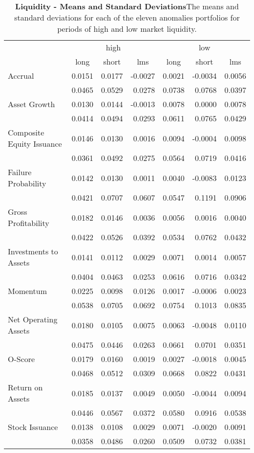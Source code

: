 \begin{table}[hbt]
\centering
\scriptsize
\caption[LIQ - Means and Standard Deviations]{\textbf{Liquidity - Means and Standard Deviations}\newline The means and standard deviations for each of the eleven anomalies portfolios for periods of high and low market liquidity.}
\label{tab:liq-stats}
\begin{tabular}{@{}lrrrrrr@{}}
\toprule
& \multicolumn{3}{c}{high} & \multicolumn{3}{c}{low} \\ \cmidrule(l){2-7} 
& \multicolumn{1}{c}{long} & \multicolumn{1}{c}{short} & \multicolumn{1}{c}{lms} & \multicolumn{1}{c}{long} & \multicolumn{1}{c}{short} & \multicolumn{1}{c}{lms} \\ \midrule
Accrual & 0.0151 & 0.0177 & -0.0027 & 0.0021 & -0.0034 & 0.0056 \\
& 0.0465 & 0.0529 & 0.0278 & 0.0738 & 0.0768 & 0.0397 \\
Asset Growth & 0.0130 & 0.0144 & -0.0013 & 0.0078 & 0.0000 & 0.0078 \\
& 0.0414 & 0.0494 & 0.0293 & 0.0611 & 0.0765 & 0.0429 \\
Composite Equity Issuance & 0.0146 & 0.0130 & 0.0016 & 0.0094 & -0.0004 & 0.0098 \\
& 0.0361 & 0.0492 & 0.0275 & 0.0564 & 0.0719 & 0.0416 \\
Failure Probability & 0.0142 & 0.0130 & 0.0011 & 0.0040 & -0.0083 & 0.0123 \\
& 0.0421 & 0.0707 & 0.0607 & 0.0547 & 0.1191 & 0.0906 \\
Gross Profitability & 0.0182 & 0.0146 & 0.0036 & 0.0056 & 0.0016 & 0.0040 \\
& 0.0422 & 0.0526 & 0.0392 & 0.0534 & 0.0762 & 0.0432 \\
Investments to Assets & 0.0141 & 0.0112 & 0.0029 & 0.0071 & 0.0014 & 0.0057 \\
& 0.0404 & 0.0463 & 0.0253 & 0.0616 & 0.0716 & 0.0342 \\
Momentum & 0.0225 & 0.0098 & 0.0126 & 0.0017 & -0.0006 & 0.0023 \\
& 0.0538 & 0.0705 & 0.0692 & 0.0754 & 0.1013 & 0.0835 \\
Net Operating Assets & 0.0180 & 0.0105 & 0.0075 & 0.0063 & -0.0048 & 0.0110 \\
& 0.0475 & 0.0446 & 0.0263 & 0.0661 & 0.0701 & 0.0351 \\
O-Score & 0.0179 & 0.0160 & 0.0019 & 0.0027 & -0.0018 & 0.0045 \\
& 0.0468 & 0.0512 & 0.0309 & 0.0668 & 0.0822 & 0.0431 \\
Return on Assets & 0.0185 & 0.0137 & 0.0049 & 0.0050 & -0.0044 & 0.0094 \\
& 0.0446 & 0.0567 & 0.0372 & 0.0580 & 0.0916 & 0.0538 \\
Stock Issuance & 0.0138 & 0.0108 & 0.0029 & 0.0071 & -0.0020 & 0.0091 \\
& 0.0358 & 0.0486 & 0.0260 & 0.0509 & 0.0732 & 0.0381 \\ \bottomrule
\end{tabular}%
\end{table}